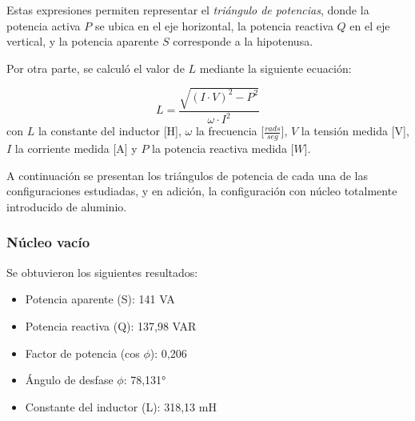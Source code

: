 \documentclass{article}
\begin{document}
                    Estas expresiones permiten representar el \textit{triángulo de potencias}, 
                    donde la potencia activa $P$ se ubica en el eje horizontal, la potencia 
                    reactiva $Q$ en el eje vertical, y la potencia aparente $S$ corresponde a 
                    la hipotenusa.\par

                Por otra parte, se calculó el valor de $L$ mediante la siguiente ecuación:

                \begin{equation*}
                    L = \frac{\sqrt{(I \cdot V)^2- P^2}}{\omega \cdot I^2} 
                \end{equation*}
                con $L$ la constante del inductor [H], $\omega$ la frecuencia [$\frac{rads}{seg}$], $V$ la tensión medida [V], $I$ la corriente medida [A] y $P$ la potencia reactiva medida [$W$]. \par
                
                    A continuación se presentan los triángulos de potencia de cada una de las configuraciones estudiadas, y en adición,
                    la configuración con núcleo totalmente introducido de aluminio. 

                    \subsubsection{Núcleo vacío}
                        Se obtuvieron los siguientes resultados:
                        \begin{itemize}
                            \item Potencia aparente (S): 141 VA
                            \item Potencia reactiva (Q): 137,98 VAR
                            \item Factor de potencia (cos $\phi$): 0,206
                            \item Ángulo de desfase $\phi$: 78,131°
                            \item Constante del inductor (L): 318,13 mH
                        \end{itemize}
\end{document}
